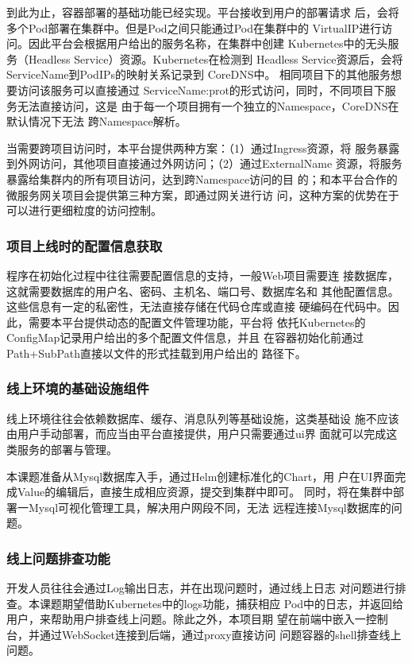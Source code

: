 \documentclass{article}
\begin{document}
  到此为止，容器部署的基础功能已经实现。平台接收到用户的部署请求
后，会将多个Pod\cite{Pods}部署在集群中。但是Pod之间只能通过Pod在集群中的
VirtualIP进行访问。因此平台会根据用户给出的服务名称，在集群中创建
Kubernetes中的无头服务（Headless Service\cite{Service}）资源。Kubernetes在检测到
Headless Service资源后，会将ServiceName到PodIPs的映射关系记录到
CoreDNS中。 相同项目下的其他服务想要访问该服务可以直接通过
ServiceName:prot的形式访问，同时，不同项目下服务无法直接访问，这是
由于每一个项目拥有一个独立的Namespace，CoreDNS在默认情况下无法
跨Namespace解析。

  当需要跨项目访问时，本平台提供两种方案：（1）通过Ingress\cite{Ingress}资源，将
服务暴露到外网访问，其他项目直接通过外网访问；（2）通过ExternalName\cite{ClusterNetWork}
资源，将服务暴露给集群内的所有项目访问，达到跨Namespace访问的目
的；和本平台合作的微服务网关项目会提供第三种方案，即通过网关进行访
问，这种方案的优势在于可以进行更细粒度的访问控制。

\subsubsection{项目上线时的配置信息获取}
  程序在初始化过程中往往需要配置信息的支持，一般Web项目需要连
接数据库，这就需要数据库的用户名、密码、主机名、端口号、数据库名和
其他配置信息。这些信息有一定的私密性，无法直接存储在代码仓库或直接
硬编码在代码中。因此，需要本平台提供动态的配置文件管理功能，平台将
依托Kubernetes的ConfigMap\cite{ConfigMaps}记录用户给出的多个配置文件信息，并且
在容器初始化前通过Path+SubPath直接以文件的形式挂载到用户给出的
路径下。

\subsubsection{线上环境的基础设施组件}
  线上环境往往会依赖数据库、缓存、消息队列等基础设施，这类基础设
施不应该由用户手动部署，而应当由平台直接提供，用户只需要通过ui界
面就可以完成这类服务的部署与管理。

  本课题准备从Mysql数据库入手，通过Helm创建标准化的Chart，用
户在UI界面完成Value的编辑后，直接生成相应资源，提交到集群中即可。
同时，将在集群中部署一Mysql可视化管理工具，解决用户网段不同，无法
远程连接Mysql数据库的问题。

\subsubsection{线上问题排查功能}
  开发人员往往会通过Log输出日志，并在出现问题时，通过线上日志
对问题进行排查。本课题期望借助Kubernetes中的logs功能，捕获相应
Pod中的日志，并返回给用户，来帮助用户排查线上问题。除此之外，本项目期
望在前端中嵌入一控制台，并通过WebSocket连接到后端，通过proxy直接访问
问题容器的shell排查线上问题。
\end{document}
